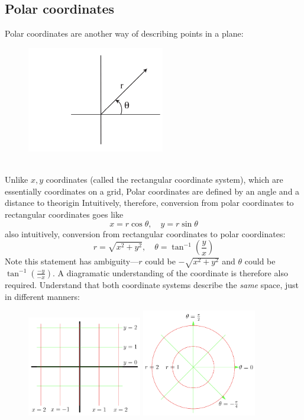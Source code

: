 \documentclass{report}
\begin{document}
\subsection{Polar coordinates} %
Polar coordinates are another way of describing points in a plane:
\begin{figure}[h]
\includegraphics[width=6cm]{Capture49}\\
\centering
{}
\end{figure}\\
Unlike $x,y$ coordinates (called the rectangular coordinate system), which are essentially
coordinates on a grid,
Polar coordinates are defined by an angle and a distance to theorigin
Intuitively, therefore, conversion from polar coordinates to rectangular coordinates goes like
\begin{equation*}
x=r\cos\theta,\quad y=r\sin\theta
\end{equation*}
also intuitively, conversion from rectangular coordinates to polar coordinates:
\begin{equation*}
r=\sqrt{x^2+y^2},\quad\theta=\tan^{-1}\left(\frac{y}{x}\right)
\end{equation*}
Note this statement has ambiguity---$r$ could be $-\sqrt{x^2+y^2}$ and $\theta$ could be 
$\tan^{-1}\left(\frac{-y}{-x}\right)$. A diagramatic understanding of the coordinate is therefore also
required. Understand that 
both coordinate systems describe the \textit{same} space, just in different manners:
\begin{figure}[h]
\includegraphics[width=5cm]{Capture50}
\includegraphics[width=5cm]{Capture51}\\
\centering
{}
\end{figure}\\
\end{document}
